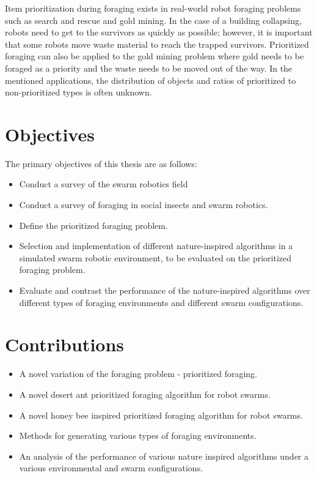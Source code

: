 Item prioritization during foraging exists in real-world robot foraging problems such as search and rescue and gold mining. In the case of a building collapsing, robots need to get to the survivors as quickly as possible; however, it is important that some robots move waste material to reach the trapped survivors. Prioritized foraging can also be applied to the gold mining problem where  gold needs to be foraged as a priority and the waste needs to be moved out of the way. In the mentioned applications, the distribution of objects and ratios of prioritized to non-prioritized types is often unknown.


\section{Objectives}
\label{sec:introduction:objectives}

The primary objectives of this thesis are as follows:

\begin{itemize}
	\item Conduct a survey of the swarm robotics field
	\item Conduct a survey of foraging in social insects and  swarm robotics.
	\item Define the prioritized foraging problem.
	\item Selection and implementation of different nature-inspired algorithms in a simulated swarm robotic environment, to be evaluated on the prioritized foraging problem.
	\item Evaluate and contrast the performance of the nature-inspired algorithms over different types of foraging environments and different swarm configurations.
\end{itemize}



\section{Contributions}
\label{sec:introduction:contributions}

\begin{itemize}
	\item A novel variation of the foraging problem - prioritized foraging.
	\item A novel desert ant prioritized foraging algorithm for robot swarms.
	\item A novel honey bee inspired prioritized foraging algorithm for robot swarms.
	\item Methods for generating various types of foraging environments.
	\item An analysis of the performance of various nature inspired algorithms under a various environmental and swarm configurations.
\end{itemize}


